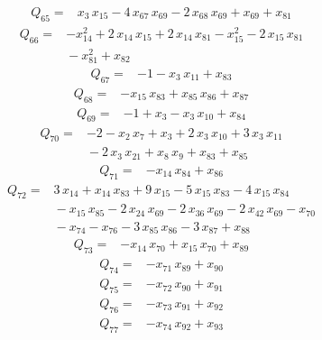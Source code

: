 \documentclass[11pt]{article}
\theoremstyle{definition}\newtheorem{definition}[theorem]{Definition}
\begin{document}
\begin{align*}
Q_{65}={}&x_{3}\,x_{15}-4\,x_{67}\,x_{69}-2\,x_{68}\,x_{69}+x_{69}+x_{81}
\end{align*}
\begin{align*}
Q_{66}={}&-x_{14}^{2}+2\,x_{14}\,x_{15}+2\,x_{14}\,x_{81}-x_{15}^{2}-2\,x_{15}\,x_{81}
\\ &{}-x_{81}^{2}+x_{82}
\end{align*}
\begin{align*}
Q_{67}={}&-1-x_{3}\,x_{11}+x_{83}
\end{align*}
\begin{align*}
Q_{68}={}&-x_{15}\,x_{83}+x_{85}\,x_{86}+x_{87}
\end{align*}
\begin{align*}
Q_{69}={}&-1+x_{3}-x_{3}\,x_{10}+x_{84}
\end{align*}
\begin{align*}
Q_{70}={}&-2-x_{2}\,x_{7}+x_{3}+2\,x_{3}\,x_{10}+3\,x_{3}\,x_{11}
\\ &{}-2\,x_{3}\,x_{21}+x_{8}\,x_{9}+x_{83}+x_{85}
\end{align*}
\begin{align*}
Q_{71}={}&-x_{14}\,x_{84}+x_{86}
\end{align*}
\begin{align*}
Q_{72}={}&3\,x_{14}+x_{14}\,x_{83}+9\,x_{15}-5\,x_{15}\,x_{83}-4\,x_{15}\,x_{84}
\\ &{}-x_{15}\,x_{85}-2\,x_{24}\,x_{69}-2\,x_{36}\,x_{69}-2\,x_{42}\,x_{69}-x_{70}
\\ &{}-x_{74}-x_{76}-3\,x_{85}\,x_{86}-3\,x_{87}+x_{88}
\end{align*}
\begin{align*}
Q_{73}={}&-x_{14}\,x_{70}+x_{15}\,x_{70}+x_{89}
\end{align*}
\begin{align*}
Q_{74}={}&-x_{71}\,x_{89}+x_{90}
\end{align*}
\begin{align*}
Q_{75}={}&-x_{72}\,x_{90}+x_{91}
\end{align*}
\begin{align*}
Q_{76}={}&-x_{73}\,x_{91}+x_{92}
\end{align*}
\begin{align*}
Q_{77}={}&-x_{74}\,x_{92}+x_{93}
\end{align*}
\end{document}
